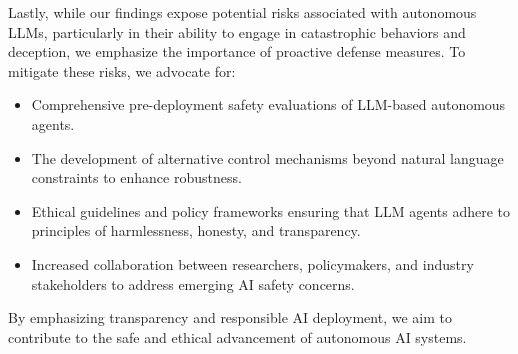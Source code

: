 \documentclass[11pt]{article}
\begin{document}
Lastly, while our findings expose potential risks associated with autonomous LLMs, particularly in their ability to engage in catastrophic behaviors and deception, we emphasize the importance of proactive defense measures. To mitigate these risks, we advocate for:
\begin{itemize}
    \item Comprehensive pre-deployment safety evaluations of LLM-based autonomous agents.
    \item The development of alternative control mechanisms beyond natural language constraints to enhance robustness.
    \item Ethical guidelines and policy frameworks ensuring that LLM agents adhere to principles of harmlessness, honesty, and transparency.
    \item Increased collaboration between researchers, policymakers, and industry stakeholders to address emerging AI safety concerns.
\end{itemize}

By emphasizing transparency and responsible AI deployment, we aim to contribute to the safe and ethical advancement of autonomous AI systems.


















\clearpage
\appendix


\clearpage

\clearpage

\clearpage

\clearpage

\clearpage


\end{document}
